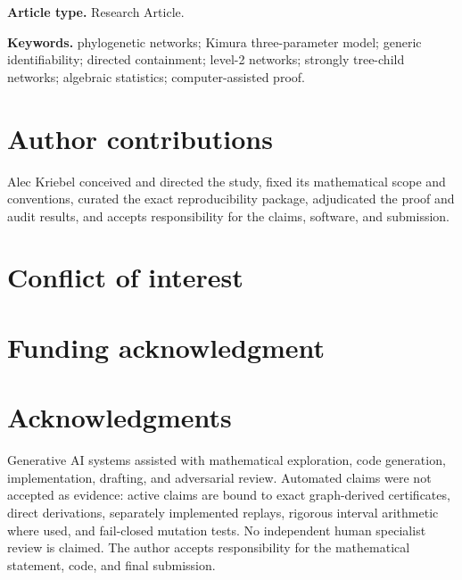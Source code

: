 \documentclass[12pt,twoside]{article}
\title{\KThreePTitle}
\author{Alec Kriebel\\
\small Independent Researcher\\
\small ORCID: \href{https://orcid.org/0009-0001-9320-500X}
{0009-0001-9320-500X}\\
\small Corresponding address:
\texttt{\detokenize{@@CORRESPONDING_POSTAL_ADDRESS@@}}\\
\small Email: \href{mailto:me@aleckriebel.com}{me@aleckriebel.com}\\
\small Telephone: \texttt{\detokenize{@@CORRESPONDING_TELEPHONE@@}}}
\date{}
\providecommand{\KThreePSubmissionRoot}{submission}
\begin{document}
\linenumbers
\maketitle

\noindent\textbf{Article type.} Research Article.

\begin{abstract}

\end{abstract}

\noindent\textbf{Keywords.} phylogenetic networks; Kimura three-parameter
model; generic identifiability; directed containment; level-2 networks;
strongly tree-child networks; algebraic statistics; computer-assisted proof.



\section*{Author contributions}

Alec Kriebel conceived and directed the study, fixed its mathematical scope
and conventions, curated the exact reproducibility package, adjudicated the
proof and audit results, and accepts responsibility for the claims, software,
and submission.

\section*{Conflict of interest}

\texttt{}

\section*{Funding acknowledgment}

\texttt{}

\section*{Acknowledgments}

Generative AI systems assisted with mathematical exploration, code
generation, implementation, drafting, and adversarial review. Automated
claims were not accepted as evidence: active claims are bound to exact
graph-derived certificates, direct derivations, separately implemented
replays, rigorous interval arithmetic where used, and fail-closed mutation
tests. No independent human specialist review is claimed. The author accepts
responsibility for the mathematical statement, code, and final submission.
\end{document}
